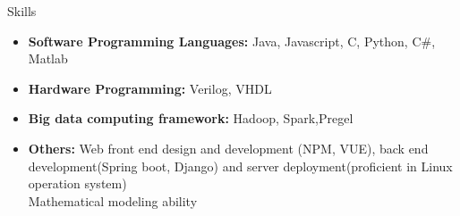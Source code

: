 \documentclass{resume} %
\begin{document}
\begin{rSection}{Skills}
    \begin{itemize}[leftmargin=0pt,itemsep=-0.3em] 
        \item {\bf Software Programming Languages: }
        Java, Javascript,  C, Python, C\#,  Matlab
        \item {\bf Hardware Programming: }
        Verilog, VHDL
        \item {\bf Big data computing framework: }
        Hadoop, Spark,Pregel
        \item {\bf Others: }
        Web front end design and development (NPM, VUE), back end development(Spring boot, Django) and server deployment(proficient in Linux operation system)\\
        Mathematical modeling ability
    \end{itemize}
\end{rSection}
\end{document}
